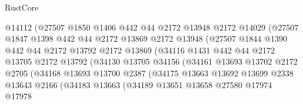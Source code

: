 \begin{lexlean}{RustCore}
\begin{coremodule}
                          @14112
                          (@27507
                            @1850
                            @1406
                            @442
                            @44
                            @2172
                            @13948
                            @2172
                            @14029
                            (@27507
                              @1847
                              @1398
                              @442
                              @44
                              @2172
                              @13869
                              @2172
                              @13948
                              (@27507
                                @1844
                                @1390
                                @442
                                @44
                                @2172
                                @13792
                                @2172
                                @13869
                                (@34116
                                  @1431
                                  @442
                                  @44
                                  @2172
                                  @13705
                                  @2172
                                  @13792
                                  (@34130
                                    @13705
                                    @34156
                                    (@34161
                                      @13693
                                      @13702
                                      @2172
                                      @2705
                                      (@34168
                                        @13693
                                        @13700
                                        @2387
                                        (@34175
                                          @13663
                                          @13692
                                          @13699
                                          @2338
                                          @13643
                                          @2166
                                          (@34183
                                            @13663
                                            (@34189
                                              @13651
                                              @13658
                                              @27580
                                              @17974
                                              @17978

\end{coremodule}
\end{lexlean}
